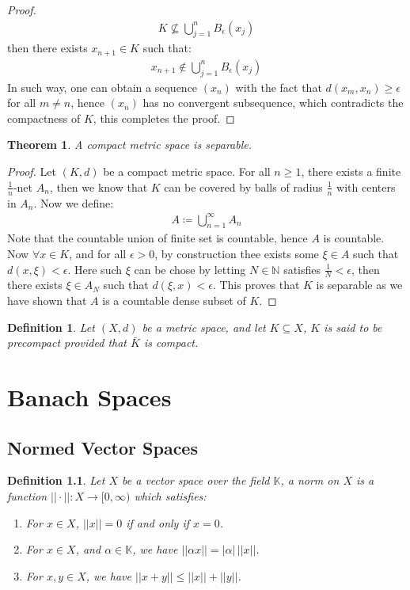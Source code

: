 \documentclass[11pt]{book}
\theoremstyle{break}
\theoremstyle{break}
\newtheorem{thm}{Theorem}[section]
\newtheorem{defn}{Definition}[corL]
\newcommand{\N}{\mathbb{N}}
\begin{document}
\begin{proof}
\begin{align*}
K \nsubseteq \bigcup_{j=1}^n B_{\epsilon}(x_j)
\end{align*}
then there exists $x_{n+1}\in K$ such that:
\begin{align*}
x_{n+1} \notin \bigcup_{j=1}^n B_\epsilon(x_j)
\end{align*}
In such way, one can obtain a sequence $(x_n)$ with the fact that $d(x_m,x_n) \geq \epsilon$ for all $m \neq n$, hence $(x_n)$ has no convergent subsequence, which contradicts the compactness of $K$, this completes the proof. 
\end{proof}


\newpage
\begin{thm}
A compact metric space is separable. 
\end{thm}
\begin{proof}
Let $(K,d)$ be a compact metric space. For all $n \geq 1$, there exists a finite $\frac{1}{n}$-net $A_n$, then we know that $K$ can be covered by balls of radius $\frac{1}{n}$ with centers in $A_n$. Now we define:
\begin{align*}
A \coloneqq \bigcup_{n=1}^\infty A_n
\end{align*}
Note that the countable union of finite set is countable, hence $A$ is countable. Now $\forall x \in K$, and for all $\epsilon>0$, by construction thee exists some $\xi \in A$ such that $d(x,\xi) < \epsilon$. Here such $\xi$ can be chose by letting $N \in \N$ satisfies $\frac{1}{N}< \epsilon$, then there exists $\xi \in A_N$ such that $d(\xi, x) < \epsilon$. This proves that $K$ is separable as we have shown that $A$ is a countable dense subset of $K$.  
\end{proof}

\begin{defn}
Let $(X,d)$ be a metric space, and let $K \subseteq X$, $K$ is said to be precompact provided that $\bar{K}$ is compact. 
\end{defn}

\newpage
\chapter{Banach Spaces}
\setcounter{section}{11}
\section[Normed Vector Spaces]{\color{red} Normed Vector Spaces\color{black}}
\begin{defn}
Let $X$ be a vector space over the field $\mathbb{K}$, a norm on $X$ is a function $||\cdot || :X \to [0,\infty)$ which satisfies:
\begin{enumerate}[topsep=3pt,itemsep=-1ex,partopsep=1ex,parsep=1ex]
\item For $x \in X$, $||x|| = 0$ if and only if $x = 0$.
\item For $x \in X$, and $\alpha \in \mathbb{K}$, we have $||\alpha x || = |\alpha| \, ||x||$.
\item For $x, y\in X$, we have $||x+y|| \leq ||x|| + ||y||$.
\end{enumerate}
\end{defn}
\end{document}
